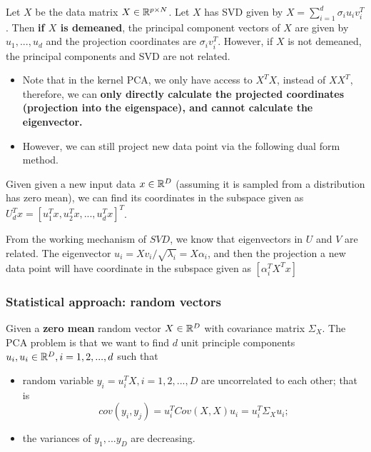 \begin{refsection}
\begin{remark}
	Let $X$ be the data matrix $X\in \mathbb{R}^{p\times N}$. Let $X$ has SVD given by $X=\sum_{i=1}^d \sigma_i u_iv_i^T$. Then \textbf{if $X$ is demeaned}, the principal component vectors of $X$ are given by $u_1,...,u_d$ and the projection coordinates are $\sigma_i v_i^T$.
	However, if $X$ is not demeaned, the principal components and SVD are not related.
\end{remark}

\begin{remark}\cite[142]{shawe2004kernel}\hfill
\begin{itemize}
    \item Note that in the kernel PCA, we only have access to $X^TX$, instead of $XX^T$, therefore, we can \textbf{only directly calculate the projected coordinates (projection into the eigenspace), and cannot calculate the eigenvector.}
    \item However, we can still project new data point via the following dual form method. 
\end{itemize}
\end{remark}






\begin{lemma}
Given given a new input data $x\in \mathbb{R}^D$ (assuming it is sampled from a distribution has zero mean), we can find its coordinates in the subspace given as $U_d^T x = [u_1^Tx,u_2^Tx,...,u_d^Tx]^T$.
\end{lemma}


\begin{lemma}
From the working mechanism of $SVD$, we know that eigenvectors in $U$ and $V$ are related.
The eigenvector $u_i = Xv_i/\sqrt{\lambda_i} = X\alpha_i$, and then the projection a new data point will have coordinate in the subspace given as
$[\alpha_i^T X^Tx]$
\end{lemma}


\subsubsection{Statistical approach: random vectors}
\begin{definition}
Given a \textbf{zero mean}  random  vector $X\in \mathbb{R}^D$ with covariance matrix $\Sigma_X$.  The PCA problem is that we want to find $d$ unit principle components $u_i,u_i\in \mathbb{R}^D, i=1,2,...,d$ such that 
\begin{itemize}
	\item random variable $y_i = u_i^T X, i=1,2,...,D$ are uncorrelated to each other; that is
	$$cov(y_i,y_j) = u_i^TCov(X,X)u_i = u_i^T\Sigma_X u_i;$$
	\item the variances of $y_1,...y_D$ are decreasing. 
\end{itemize}


\end{definition}
\end{refsection}
